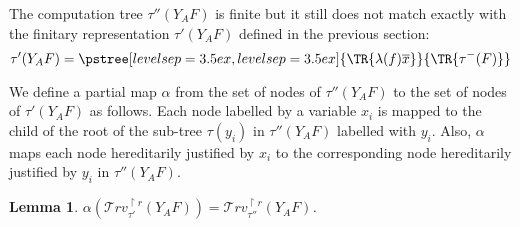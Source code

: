\documentclass{article}
\newtheorem{lemma}[theorem]{Lemma}
\newcommand{\travset}{\mathcal{T}rv}
\newcommand{\tree}[2][levelsep=3.5ex]{\pstree[levelsep=3.5ex,#1]{\TR{#2}}}
\begin{document}
The computation tree $\tau''(Y_A F)$ is finite but it still does not match exactly with the finitary representation $\tau'(Y_A F)$ defined in the previous section:
$$\tau'(Y_A F) = \tree{ \lambda (f) \overline{x}}{\TR{\tau^-(F)}}   
$$

We define a partial map $\alpha$ from the set of nodes of $\tau''(Y_A F)$ to the set of nodes of $\tau'(Y_A F)$ as follows. Each node labelled by a variable $x_i$ is mapped to the child of the root of the sub-tree $\tau(y_i)$ in $\tau''(Y_A F)$ labelled with $y_i$. Also, $\alpha$ maps each node hereditarily justified by $x_i$ to the corresponding node hereditarily justified by $y_i$ in $\tau''(Y_A F)$.

\begin{lemma}
$\alpha(\travset^{\upharpoonright r}_{\tau'}(Y_A F)) = \travset^{\upharpoonright r}_{\tau''}(Y_A F)$.
\end{lemma}
\end{document}
